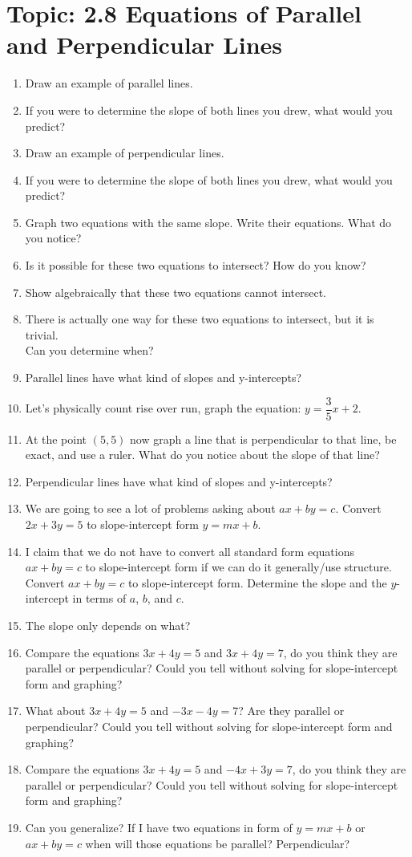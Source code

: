 \documentclass[12pt,letterpaper]{article}
\begin{document}
\section*{Topic: 2.8 Equations of Parallel and Perpendicular Lines}
\begin{enumerate}
    \item Draw an example of parallel lines.
    \item If you were to determine the slope of both lines you drew, what would you predict?
    \item Draw an example of perpendicular lines.
    \item If you were to determine the slope of both lines you drew, what would you predict?
    \item Graph two equations with the same slope. Write their equations. What do you notice?
    \item Is it possible for these two equations to intersect? How do you know?
    \item Show algebraically that these two equations cannot intersect.
    \item There is actually one way for these two equations to intersect, but it is trivial. \\Can you determine when?
    \item Parallel lines have what kind of slopes and y-intercepts?
    \item Let's physically count rise over run, graph the equation: $y=\dfrac{3}{5}x+2$.
    \item At the point $(5,5)$ now graph a line that is perpendicular to that line, be exact, and use a ruler. What do you notice about the slope of that line?
    \item Perpendicular lines have what kind of slopes and y-intercepts?
    \item We are going to see a lot of problems asking about $ax+by=c$. Convert $2x+3y=5$ to slope-intercept form $y=mx+b$.
    \item I claim that we do not have to convert all standard form equations $ax+by=c$ to slope-intercept form if we can do it generally/use structure. Convert $ax+by=c$ to slope-intercept form. Determine the slope and the $y$-intercept in terms of $a$, $b$, and $c$.
    \item The slope only depends on what?
    \item Compare the equations $3x+4y=5$ and $3x+4y=7$, do you think they are parallel or perpendicular? Could you tell without solving for slope-intercept form and graphing?
    \item What about $3x+4y=5$ and $-3x-4y=7$? Are they parallel or perpendicular? Could you tell without solving for slope-intercept form and graphing?
    \item Compare the equations $3x+4y=5$ and $-4x+3y=7$, do you think they are parallel or perpendicular? Could you tell without solving for slope-intercept form and graphing?
    \item Can you generalize? If I have two equations in form of $y=mx+b$ or $ax+by=c$ when will those equations be parallel? Perpendicular?
\end{enumerate}
\end{document}

